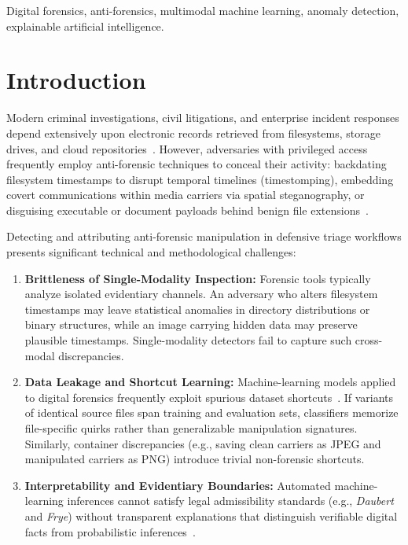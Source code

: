 \documentclass[conference]{IEEEtran}
\begin{document}
\begin{IEEEkeywords}
Digital forensics, anti-forensics, multimodal machine learning, anomaly detection, explainable artificial intelligence.
\end{IEEEkeywords}

\section{Introduction}
Modern criminal investigations, civil litigations, and enterprise incident responses depend extensively upon electronic records retrieved from filesystems, storage drives, and cloud repositories~\cite{carrier2005file, casey2011digital}. However, adversaries with privileged access frequently employ anti-forensic techniques to conceal their activity: backdating filesystem timestamps to disrupt temporal timelines (timestomping), embedding covert communications within media carriers via spatial steganography, or disguising executable or document payloads behind benign file extensions~\cite{conlan2016anti, buchholz2004investigation}.

Detecting and attributing anti-forensic manipulation in defensive triage workflows presents significant technical and methodological challenges:
\begin{enumerate}
    \item \textbf{Brittleness of Single-Modality Inspection:} Forensic tools typically analyze isolated evidentiary channels. An adversary who alters filesystem timestamps may leave statistical anomalies in directory distributions or binary structures, while an image carrying hidden data may preserve plausible timestamps. Single-modality detectors fail to capture such cross-modal discrepancies.
    \item \textbf{Data Leakage and Shortcut Learning:} Machine-learning models applied to digital forensics frequently exploit spurious dataset shortcuts~\cite{garfinkel2009bringing}. If variants of identical source files span training and evaluation sets, classifiers memorize file-specific quirks rather than generalizable manipulation signatures. Similarly, container discrepancies (e.g., saving clean carriers as JPEG and manipulated carriers as PNG) introduce trivial non-forensic shortcuts.
    \item \textbf{Interpretability and Evidentiary Boundaries:} Automated machine-learning inferences cannot satisfy legal admissibility standards (e.g., \textit{Daubert} and \textit{Frye}) without transparent explanations that distinguish verifiable digital facts from probabilistic inferences~\cite{roussev2009file}.
\end{enumerate}
\end{document}
